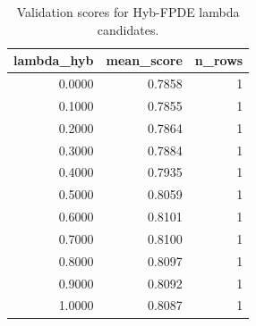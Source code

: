 \begin{table}[t]
\caption{Validation scores for Hyb-FPDE lambda candidates.}
\label{tab:lambda_distribution_computed}
\centering
\begin{tabular}{rrr}
\toprule
lambda\_hyb & mean\_score & n\_rows \\
\midrule
0.0000 & 0.7858 & 1 \\
0.1000 & 0.7855 & 1 \\
0.2000 & 0.7864 & 1 \\
0.3000 & 0.7884 & 1 \\
0.4000 & 0.7935 & 1 \\
0.5000 & 0.8059 & 1 \\
0.6000 & 0.8101 & 1 \\
0.7000 & 0.8100 & 1 \\
0.8000 & 0.8097 & 1 \\
0.9000 & 0.8092 & 1 \\
1.0000 & 0.8087 & 1 \\
\bottomrule
\end{tabular}

\end{table}
